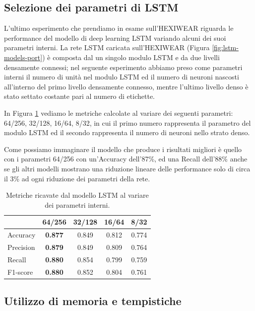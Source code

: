 \subsection{Selezione dei parametri di LSTM}
\label{ssec:selezione-dei-parametri-di-lstm-hexi}

L'ultimo esperimento che prendiamo in esame sull'HEXIWEAR riguarda le performance del modello di deep learning LSTM variando alcuni dei suoi parametri interni. 
La rete LSTM caricata sull'HEXIWEAR (Figura \ref{fig:lstm-models-port}) è composta dal un singolo modulo LSTM e da due livelli densamente connessi; nel seguente esperimento abbiamo preso come parametri interni il numero di unità nel modulo LSTM ed il numero di neuroni nascosti all'interno del primo livello densamente connesso, mentre l'ultimo livello denso è stato settato costante pari al numero di etichette. 

In Figura \ref{tab:metrics-lstm-param-hexi} vediamo le metriche calcolate al variare dei seguenti parametri: 64/256, 32/128, 16/64, 8/32, in cui il primo numero rappresenta il parametro del modulo LSTM ed il secondo rappresenta il numero di neuroni nello strato denso. 

Come possiamo immaginare il modello che produce i risultati migliori è quello con i parametri 64/256 con un'Accuracy dell'87\%, ed una Recall dell'88\% anche se gli altri modelli mostrano una riduzione lineare delle performance solo di circa il 3\% ad ogni riduzione dei parametri della rete.

\begin{table}
    \centering
    \begin{tabular}{l c c c c}
        \hline
        & 64/256 & 32/128 & 16/64 & 8/32 \\
        \hline
        Accuracy & \textbf{0.877} & 0.849 & 0.812 & 0.774 \\
        Precision & \textbf{0.879} & 0.849 & 0.809 & 0.764 \\
        Recall & \textbf{0.880} & 0.854 & 0.799 & 0.759 \\
        F1-score & \textbf{0.880} & 0.852 & 0.804 & 0.761 \\
        \hline
    \end{tabular}
    \caption{Metriche ricavate dal modello LSTM al variare dei parametri interni.}
    \label{tab:metrics-lstm-param-hexi}
\end{table}

\subsection{Utilizzo di memoria e tempistiche}
\label{ssec:utilizzo-di-memoria-e-tempistiche-hexi}

